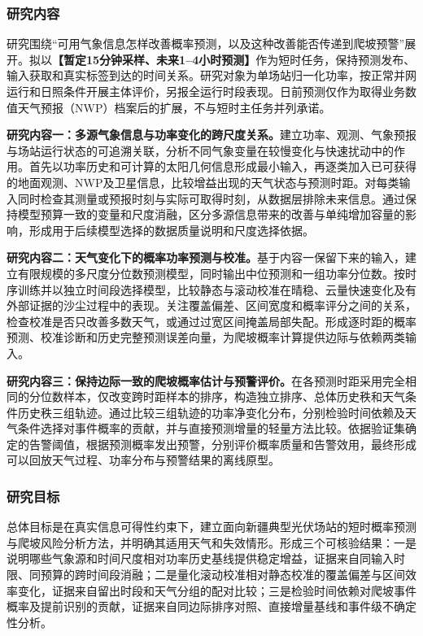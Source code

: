 \justifying
\NSFCBodyText

\subsubsection{研究内容}
研究围绕“可用气象信息怎样改善概率预测，以及这种改善能否传递到爬坡预警”展开。拟以\textbf{【暂定15分钟采样、未来1--4小时预测】}作为短时任务，保持预测发布、输入获取和真实标签到达的时间关系。研究对象为单场站归一化功率，按正常并网运行和日照条件开展主体评价，另报全运行时段表现。日前预测仅作为取得业务数值天气预报（NWP）档案后的扩展，不与短时主任务并列承诺。

\textbf{研究内容一：多源气象信息与功率变化的跨尺度关系。}建立功率、观测、气象预报与场站运行状态的可追溯关联，分析不同气象变量在较慢变化与快速扰动中的作用。首先以功率历史和可计算的太阳几何信息形成最小输入，再逐类加入已可获得的地面观测、NWP及卫星信息，比较增益出现的天气状态与预测时距。对每类输入同时检查其测量或预报时刻与实际可取得时刻，从数据层排除未来信息。通过保持模型预算一致的变量和尺度消融，区分多源信息带来的改善与单纯增加容量的影响，形成用于后续模型选择的数据质量说明和尺度选择依据。

\textbf{研究内容二：天气变化下的概率功率预测与校准。}基于内容一保留下来的输入，建立有限规模的多尺度分位数预测模型，同时输出中位预测和一组功率分位数。按时序训练并以独立时间段选择模型，比较静态与滚动校准在晴稳、云量快速变化及有外部证据的沙尘过程中的表现。关注覆盖偏差、区间宽度和概率评分之间的关系，检查校准是否只改善多数天气，或通过过宽区间掩盖局部失配。形成逐时距的概率预测、校准诊断和历史完整预测误差向量，为爬坡概率计算提供边际与依赖两类输入。

\textbf{研究内容三：保持边际一致的爬坡概率估计与预警评价。}在各预测时距采用完全相同的分位数样本，仅改变跨时距样本的排序，构造独立排序、总体历史秩和天气条件历史秩三组轨迹。通过比较三组轨迹的功率净变化分布，分别检验时间依赖及天气条件选择对事件概率的贡献，并与直接预测增量的轻量方法比较。依据验证集确定的告警阈值，根据预测概率发出预警，分别评价概率质量和告警效用，最终形成可以回放天气过程、功率分布与预警结果的离线原型。

\subsubsection{研究目标}
总体目标是在真实信息可得性约束下，建立面向新疆典型光伏场站的短时概率预测与爬坡风险分析方法，并明确其适用天气和失效情形。形成三个可核验结果：一是说明哪些气象源和时间尺度相对功率历史基线提供稳定增益，证据来自同输入时限、同预算的跨时间段消融；二是量化滚动校准相对静态校准的覆盖偏差与区间效率变化，证据来自留出时段和天气分组的配对比较；三是检验时间依赖对爬坡事件概率及提前识别的贡献，证据来自同边际排序对照、直接增量基线和事件级不确定性分析。

